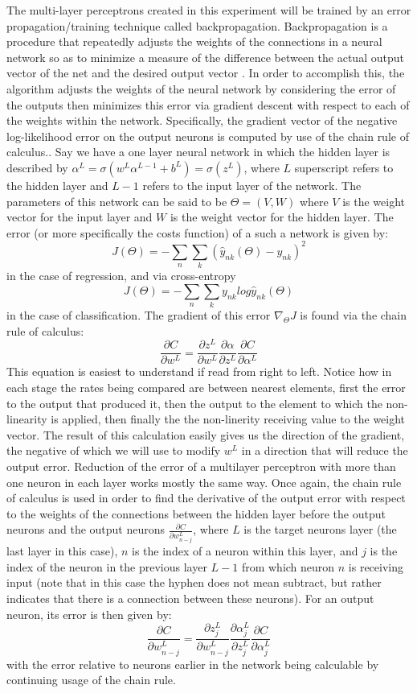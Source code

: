 The multi-layer perceptrons created in this experiment will be trained
by an error propagation/training technique called backpropagation.
Backpropagation is a procedure that repeatedly adjusts the weights of the
connections in a neural network so as to minimize a measure of the difference
between the actual output vector of the net and the desired output
vector \cite{Rumelhart}. In order to accomplish this, the algorithm
adjusts the weights of the neural network by considering the error of
the outputs then minimizes this error via gradient descent with respect
to each of the weights within the network. Specifically, the gradient
vector of the negative log-likelihood error on the output neurons is
computed by use of the chain rule of calculus.\cite{Murphy}. Say we
have a one layer neural network in which the hidden layer is described
by $\alpha^{L} = \sigma(w^{L}\alpha^{L-1} + b^{L}) = \sigma(z^{L})$,
where $L$ superscript refers to the hidden layer and $L-1$ refers
to the input layer of the network. The parameters of this network can
be said to be $\Theta = (V,W)$ where $V$ is the weight vector for the input
layer and $W$ is the weight vector for the hidden layer. The error (or
more specifically the costs function) of a such a network is given by:
$$J(\Theta ) = - \sum_n\sum_k(\hat{y}_{nk}(\Theta)-y_{nk})^2$$
in the case of regression, and via cross-entropy
$$J(\Theta ) = - \sum_n\sum_ky_{nk}log\hat{y}_{nk}(\Theta)$$
in the case of classification. The gradient of this error $\nabla_{\Theta}J$
is found via the chain rule of calculus:
$$\frac{\partial C}{\partial
w^{L}} = \frac{\partial z^{L}}{\partial
w^{L}}\frac{\partial \alpha}{\partial z^{L}}\frac{\partial
  C}{\partial \alpha^{L}}$$
This equation is easiest to understand if read from right to left.
Notice how in each stage the rates being compared are between nearest
elements, first the error to the output that produced it, then the output
to the element to which the non-linearity is applied, then finally the the
non-linerity receiving value to the weight vector. The result of this
calculation easily gives us the direction of the gradient, the negative of
which we will use to modify $w^{L}$ in a direction that will reduce the output
error. Reduction of the error of a multilayer perceptron with more
than one neuron in each layer works mostly the same way. Once again,
the chain rule of calculus is used in order to find the derivative of
the output error with respect to the weights of the connections
between the hidden layer before the output neurons and the output
neurons $\frac{\partial C}{\partial w^{L}_{n-j}}$, where $L$ is the
target neurons layer (the last layer in this case), $n$ is the index of
a neuron within this layer, and $j$ is the index of the neuron in the
previous layer $L-1$ from which neuron $n$ is receiving input (note
that in this case the hyphen does not mean subtract, but rather
indicates that there is a connection between these neurons). For an output
neuron, its error is then given by:
$$\frac{\partial C}{\partial w^{L}_{n-j}} = \frac{\partial z^{L}_{j}}{\partial w^{L}_{n-j}}\frac{\partial \alpha^{L}_{j}}{\partial z^{L}_{j}}\frac{\partial C}{\partial \alpha^{L}_{j}}$$
with the error relative to neurons earlier in the network being calculable by
continuing usage of the chain rule.

